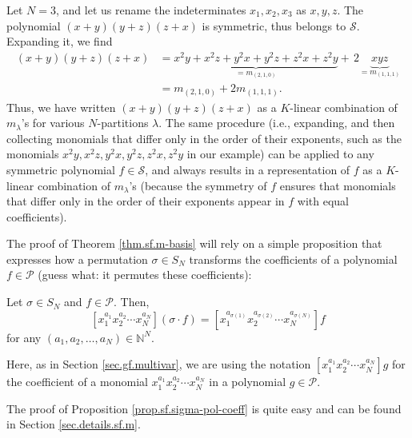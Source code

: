 \begin{example}
\label{exa.sf.m-basis.1}Let $N=3$, and let us rename the indeterminates
$x_{1},x_{2},x_{3}$ as $x,y,z$. The polynomial $\left(  x+y\right)  \left(
y+z\right)  \left(  z+x\right)  $ is symmetric, thus belongs to $\mathcal{S}$.
Expanding it, we find%
\begin{align*}
\left(  x+y\right)  \left(  y+z\right)  \left(  z+x\right)   &
=\underbrace{x^{2}y+x^{2}z+y^{2}x+y^{2}z+z^{2}x+z^{2}y}_{=m_{\left(
2,1,0\right)  }}+\,2\underbrace{xyz}_{=m_{\left(  1,1,1\right)  }}\\
&  =m_{\left(  2,1,0\right)  }+2m_{\left(  1,1,1\right)  }.
\end{align*}
Thus, we have written $\left(  x+y\right)  \left(  y+z\right)  \left(
z+x\right)  $ as a $K$-linear combination of $m_{\lambda}$'s for various
$N$-partitions $\lambda$. The same procedure (i.e., expanding, and then
collecting monomials that differ only in the order of their exponents, such as
the monomials $x^{2}y,x^{2}z,y^{2}x,y^{2}z,z^{2}x,z^{2}y$ in our example) can
be applied to any symmetric polynomial $f\in\mathcal{S}$, and always results
in a representation of $f$ as a $K$-linear combination of $m_{\lambda}$'s
(because the symmetry of $f$ ensures that monomials that differ only in the
order of their exponents appear in $f$ with equal coefficients).
\end{example}

The proof of Theorem \ref{thm.sf.m-basis} will rely on a simple proposition
that expresses how a permutation $\sigma\in S_{N}$ transforms the coefficients
of a polynomial $f\in\mathcal{P}$ (guess what: it permutes these coefficients):

\begin{proposition}
\label{prop.sf.sigma-pol-coeff}Let $\sigma\in S_{N}$ and $f\in\mathcal{P}$.
Then,%
\[
\left[  x_{1}^{a_{1}}x_{2}^{a_{2}}\cdots x_{N}^{a_{N}}\right]  \left(
\sigma\cdot f\right)  =\left[  x_{1}^{a_{\sigma\left(  1\right)  }}%
x_{2}^{a_{\sigma\left(  2\right)  }}\cdots x_{N}^{a_{\sigma\left(  N\right)
}}\right]  f
\]
for any $\left(  a_{1},a_{2},\ldots,a_{N}\right)  \in\mathbb{N}^{N}$.
\end{proposition}

Here, as in Section \ref{sec.gf.multivar}, we are using the notation $\left[
x_{1}^{a_{1}}x_{2}^{a_{2}}\cdots x_{N}^{a_{N}}\right]  g$ for the coefficient
of a monomial $x_{1}^{a_{1}}x_{2}^{a_{2}}\cdots x_{N}^{a_{N}}$ in a polynomial
$g\in\mathcal{P}$.

The proof of Proposition \ref{prop.sf.sigma-pol-coeff} is quite easy and can
be found in Section \ref{sec.details.sf.m}.


